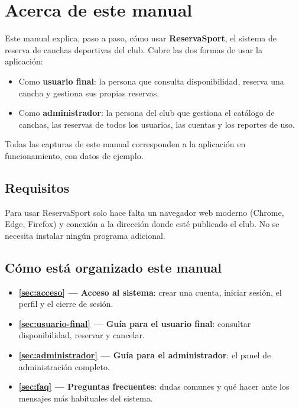 
\section*{Acerca de este manual}

Este manual explica, paso a paso, cómo usar \textbf{ReservaSport}, el sistema
de reserva de canchas deportivas del club. Cubre las dos formas de usar la
aplicación:

\begin{itemize}
  \item Como \textbf{usuario final}: la persona que consulta disponibilidad,
        reserva una cancha y gestiona sus propias reservas.
  \item Como \textbf{administrador}: la persona del club que gestiona el
        catálogo de canchas, las reservas de todos los usuarios, las cuentas
        y los reportes de uso.
\end{itemize}

Todas las capturas de este manual corresponden a la aplicación en
funcionamiento, con datos de ejemplo.

\subsection*{Requisitos}

Para usar ReservaSport solo hace falta un navegador web moderno (Chrome,
Edge, Firefox) y conexión a la dirección donde esté publicado el club. No
se necesita instalar ningún programa adicional.

\subsection*{Cómo está organizado este manual}

\begin{itemize}
  \item \textbf{\ref{sec:acceso} — Acceso al sistema}: crear una cuenta,
        iniciar sesión, el perfil y el cierre de sesión.
  \item \textbf{\ref{sec:usuario-final} — Guía para el usuario final}:
        consultar disponibilidad, reservar y cancelar.
  \item \textbf{\ref{sec:administrador} — Guía para el administrador}:
        el panel de administración completo.
  \item \textbf{\ref{sec:faq} — Preguntas frecuentes}: dudas comunes y qué
        hacer ante los mensajes más habituales del sistema.
\end{itemize}


